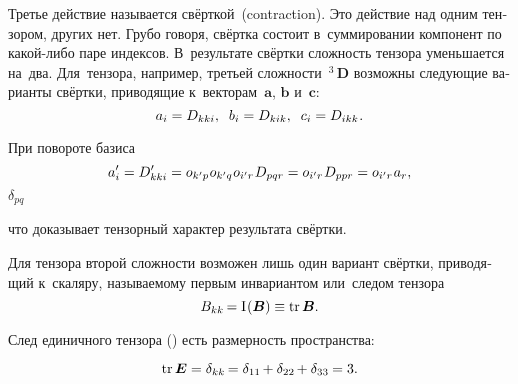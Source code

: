 \begin{otherlanguage}{russian}
Третье действие называется свёрткой~(contraction). Это действие над одним тензором, других  нет. Грубо говоря, свёртка состоит в~суммировании компонент по какой\hbox{-}либо паре индексов. В~результате свёртки сложность тензора уменьшается на~два. Для~тензора, например, третьей сложности~${^3\!\!\,\bm{D}}$ возможны следующие варианты свёртки, приводящие к~векторам~${\bm{a}}$, ${\bm{b}}$ и~${\bm{c}}$:
\begin{equation}\label{action:3}
a_{i} = D_{kki},\;\; b_{i} = D_{kik},\;\; c_{i} = D_{ikk} \hspace{0.1ex}.
\end{equation}

\vspace{-0.16em} При повороте базиса
\[
a'_{i} = D'_{kki} = \tikzmark{BeginDeltaPQBrace} {\cosinematrix{k'p} \hspace{.1ex} \cosinematrix{k'q}} \tikzmark{EndDeltaPQBrace} \hspace{.1ex} \cosinematrix{i'r} \hspace{0.16ex} D_{pqr} = \cosinematrix{i'r} \hspace{.16ex} D_{ppr} = \cosinematrix{i'r} \hspace{0.16ex} a_{r},
\]
%
{${\scriptstyle \delta_{pq}}$}

\vspace{-0.25em} \noindent что доказывает тензорный характер результата свёртки.

Для тензора второй сложности возможен лишь один вариант свёртки, приводящий к~скаляру, называемому первым инвариантом или~следом тензора
\nopagebreak\vspace{-0.16em}\[
B_{kk} \hspace{-0.2ex} = \mathrm{I}\hspace{0.16ex}(\bm{B}) \equiv \operatorname{tr} \bm{B}.
\]

\vspace{-0.16em} След единичного тензора () есть размерность пространства:

\nopagebreak\vspace{-0.2em}\begin{equation*}
\operatorname{tr} \bm{E} = \delta_{kk} \hspace{-0.2ex} = \delta_{11} \hspace{-0.2ex} + \delta_{22} \hspace{-0.2ex} + \delta_{33} \hspace{-0.1ex} = 3.
\end{equation*}


\end{otherlanguage}
